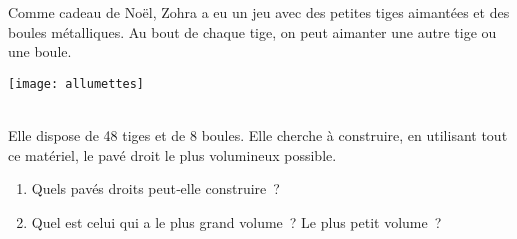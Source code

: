 \begin{enigme}

\begin{minipage}[c]{0.58\linewidth}
Comme cadeau de Noël, Zohra a eu un jeu avec des petites tiges aimantées et des boules métalliques. Au bout de chaque tige, on peut aimanter une autre tige ou une boule.
 \end{minipage} \hfill%
 \begin{minipage}[c]{0.38\linewidth}
  \texttt{[image: allumettes]}
  \end{minipage} \\
Elle dispose de 48 tiges et de 8 boules. Elle cherche à construire, en utilisant tout ce matériel, le pavé droit le plus volumineux possible.
\begin{enumerate}
 \item Quels pavés droits peut‑elle construire ?
 \item Quel est celui qui a le plus grand volume ? Le plus petit volume ?
 \end{enumerate}

\end{enigme} 
